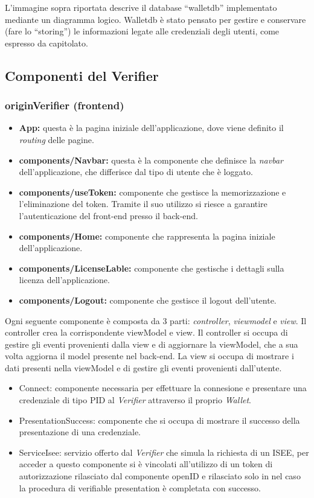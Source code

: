     L’immagine sopra riportata descrive il database “walletdb” implementato mediante un diagramma logico.
    Walletdb è stato pensato per gestire e conservare (fare lo “storing”) le informazioni legate alle credenziali degli utenti, come espresso da capitolato.\\
    

\subsection{Componenti del \textbf{Verifier}}
\subsubsection{originVerifier (frontend)}
\begin{itemize}
    \item \textbf{App:} questa è la pagina iniziale dell'applicazione, dove viene definito il \textit{routing} delle pagine.
    \item \textbf{components/Navbar:} questa è la componente che definisce la \textit{navbar} dell'applicazione, che differisce dal tipo di utente che è loggato.
    \item \textbf{components/useToken:} componente che gestisce la memorizzazione e l'eliminazione del token. Tramite il suo utilizzo si riesce a garantire l'autenticazione del front-end presso il back-end.
    \item \textbf{components/Home:} componente che rappresenta la pagina iniziale dell'applicazione.
    \item \textbf{components/LicenseLable:} componente che gestische i dettagli sulla licenza dell'applicazione.
    \item \textbf{components/Logout:} componente che gestisce il logout dell'utente.  
\end{itemize}

Ogni seguente componente è composta da 3 parti: \textit{controller}, \textit{viewmodel} e \textit{view}. Il controller crea la corrispondente
viewModel e view. Il controller si occupa di gestire gli eventi provenienti dalla view e di aggiornare la viewModel, che a sua volta aggiorna 
il model presente nel back-end. La view si occupa di mostrare i dati presenti nella viewModel e di gestire gli eventi provenienti dall'utente.

\begin{itemize}
    \item Connect: componente necessaria per effettuare la connesione e presentare una credenziale di tipo PID al \textit{Verifier} attraverso il proprio \textit{Wallet}.
    \item PresentationSuccess: componente che si occupa di mostrare il successo della presentazione di una credenziale.
    \item ServiceIsee: servizio offerto dal \textit{Verifier} che simula la richiesta di un ISEE, per acceder a questo componente si è vincolati all'utilizzo di un token di autorizzazione rilasciato dal componente openID e rilasciato solo in nel caso la procedura di verifiable presentation è completata con successo. 
\end{itemize}

